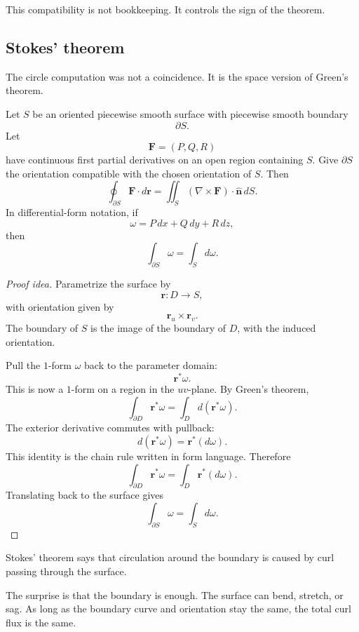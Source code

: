 This compatibility is not bookkeeping.  It controls the sign of the theorem.

\subsection{Stokes' theorem}

The circle computation was not a coincidence.  It is the space version of Green's
theorem.

\begin{theorem}
Let \(S\) be an oriented piecewise smooth surface with piecewise smooth boundary
\[
    \partial S.
\]
Let
\[
    \mathbf F=(P,Q,R)
\]
have continuous first partial derivatives on an open region containing \(S\).  Give
\(\partial S\) the orientation compatible with the chosen orientation of \(S\).  Then
\[
\boxed{
    \oint_{\partial S}\mathbf F\cdot d\mathbf r
    =
    \iint_S(\nabla\times\mathbf F)\cdot\widehat{\mathbf n}\,dS.
}
\]
In differential-form notation, if
\[
    \omega=P\,dx+Q\,dy+R\,dz,
\]
then
\[
\boxed{
    \int_{\partial S}\omega
    =
    \int_S d\omega.
}
\]
\end{theorem}

\begin{proof}[Proof idea]
Parametrize the surface by
\[
    \mathbf r:D\to S,
\]
with orientation given by
\[
    \mathbf r_u\times\mathbf r_v.
\]
The boundary of \(S\) is the image of the boundary of \(D\), with the induced
orientation.

Pull the \(1\)-form \(\omega\) back to the parameter domain:
\[
    \mathbf r^*\omega.
\]
This is now a \(1\)-form on a region in the \(uv\)-plane.  By Green's theorem,
\[
    \int_{\partial D}\mathbf r^*\omega
    =
    \int_D d(\mathbf r^*\omega).
\]
The exterior derivative commutes with pullback:
\[
    d(\mathbf r^*\omega)=\mathbf r^*(d\omega).
\]
This identity is the chain rule written in form language.  Therefore
\[
    \int_{\partial D}\mathbf r^*\omega
    =
    \int_D \mathbf r^*(d\omega).
\]
Translating back to the surface gives
\[
    \int_{\partial S}\omega
    =
    \int_S d\omega.
\]
\end{proof}

Stokes' theorem says that circulation around the boundary is caused by curl passing
through the surface.

The surprise is that the boundary is enough.  The surface can bend, stretch, or sag.
As long as the boundary curve and orientation stay the same, the total curl flux is the
same.

